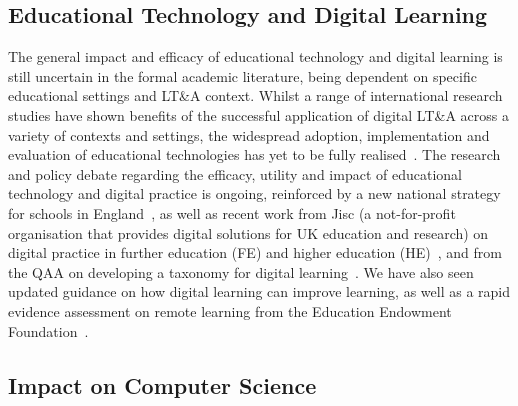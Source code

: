 \documentclass[sigconf]{acmart}
\begin{document}
\subsection{Educational Technology and Digital Learning}

The general impact and efficacy of educational technology and digital
learning is still uncertain in the formal academic literature, being
dependent on specific educational settings and LT\&A context. Whilst a
range of international research studies have shown benefits of the
successful application of digital LT\&A across a variety of contexts
and settings, the widespread adoption, implementation and evaluation
of educational technologies has yet to be fully
realised~\cite{decodinglearning:2012,means:2014,ecjrc:2017,mayer:2018}.
The research and policy debate regarding the efficacy, utility and
impact of educational technology and digital practice is ongoing,
reinforced by a new national strategy for schools in
England~\cite{dfe:2019}, as well as recent work from Jisc (a
not-for-profit organisation that provides digital solutions for UK
education and research) on digital practice in further education (FE)
and higher education (HE)~\cite{lanclos+phipps:2019}, and from the QAA
on developing a taxonomy for digital
learning~\cite{qaadigtaxonomy:2020}. We have also seen updated
guidance on how digital learning can improve learning, as well as a
rapid evidence assessment on remote learning from the Education
Endowment Foundation~\cite{eefdigtech:2019,eefremote:2020}.

\subsection{Impact on Computer Science}
\end{document}
